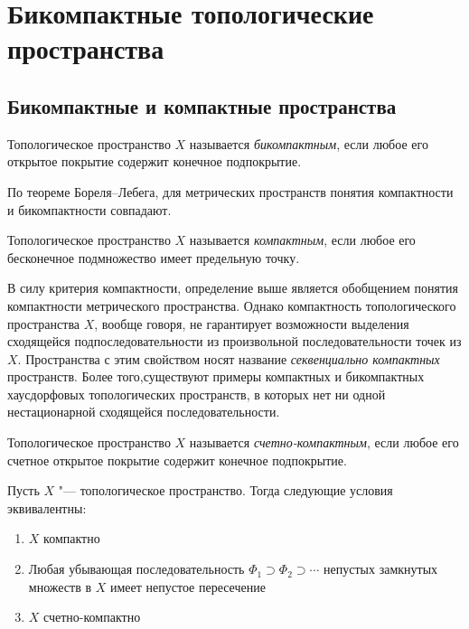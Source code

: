 \section{Бикомпактные топологические пространства}

\subsection{Бикомпактные и компактные пространства}

\begin{definition}
    Топологическое пространство $X$ называется \textit{бикомпактным}, если любое его открытое покрытие содержит конечное подпокрытие.
\end{definition}

\begin{note}
    По теореме Бореля--Лебега, для метрических пространств понятия компактности и бикомпактности совпадают.
\end{note}

\begin{definition}
    Топологическое пространство $X$ называется \textit{компактным}, если любое его бесконечное подмножество имеет предельную точку.
\end{definition}

\begin{note}
    В силу критерия компактности, определение выше является обобщением понятия компактности метрического пространства. Однако компактность топологического пространства $X$, вообще говоря, не гарантирует возможности выделения сходящейся подпоследовательности из произвольной последовательности точек из $X$. Пространства с этим свойством носят название \textit{секвенциально компактных} пространств. Более того,существуют примеры компактных и бикомпактных хаусдорфовых топологических пространств, в которых нет ни одной нестационарной сходящейся последовательности.
\end{note}

\begin{definition}
    Топологическое пространство $X$ называется \textit{счетно-компактным}, если любое его счетное открытое покрытие содержит конечное подпокрытие.
\end{definition}

\begin{theorem}\label{comptheo}
    Пусть $X$ "--- топологическое пространство. Тогда следующие условия эквивалентны:
    \begin{enumerate}
        \item $X$ компактно
        
        \item Любая убывающая последовательность $\Phi_1\supset \Phi_2\supset \dotsb$ непустых замкнутых множеств в $X$ имеет непустое пересечение

        \item $X$ счетно-компактно
    \end{enumerate}
\end{theorem}

